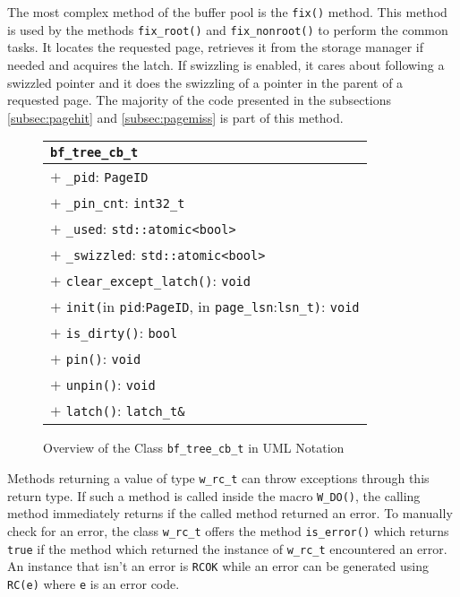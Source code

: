 	The most complex method of the buffer pool is the \lstinline{fix()} method. This method is used by the methods \lstinline{fix_root()} and \lstinline{fix_nonroot()} to perform the common tasks. It locates the requested page, retrieves it from the storage manager if needed and acquires the latch. If swizzling is enabled, it cares about following a swizzled pointer and it does the swizzling of a pointer in the parent of a requested page. The majority of the code presented in the subsections \ref{subsec:pagehit} and \ref{subsec:pagemiss} is part of this method.
		
\begin{@empty}
	\begin{figure}[ht!]
		\centering
		\scriptsize
		\setlength{\fboxsep}{0pt}
		\colorbox{listingsbackground}{\begin{tabularx}{\textwidth}{|X|}
			\hline
			\texttt{\textbf{bf\_tree\_cb\_t}}																																\\	\hline
			$+$ \texttt{\_pid}: \texttt{PageID}																															\\
			$+$ \texttt{\_pin\_cnt}: \texttt{int32\_t}																														\\
			$+$ \texttt{\_used}: \texttt{std::atomic<bool>}																													\\
			$+$ \texttt{\_swizzled}: \texttt{std::atomic<bool>}																												\\	\hline
			$+$ \texttt{clear\_except\_latch()}: \texttt{void}																													\\
			$+$ \texttt{init(}in \texttt{pid}:\texttt{PageID}, in \texttt{page\_lsn}:\texttt{lsn\_t)}: \texttt{void}																					\\
			$+$ \texttt{is\_dirty()}: \texttt{bool}																															\\
			$+$ \texttt{pin()}: \texttt{void}																																\\
			$+$ \texttt{unpin()}: \texttt{void}																																\\
			$+$ \texttt{latch()}: \texttt{latch\_t\&}																															\\	\hline
		\end{tabularx}}
		\caption{Overview of the Class \lstinline{bf_tree_cb_t} in UML Notation}
		\label{fig:cbdesign}
	\end{figure}
\end{@empty}

	Methods returning a value of type \lstinline{w_rc_t} can throw exceptions through this return type. If such a method is called inside the macro \lstinline{W_DO()}, the calling method immediately returns if the called method returned an error. To manually check for an error, the class \lstinline{w_rc_t} offers the method \lstinline{is_error()} which returns \lstinline{true} if the method which returned the instance of \lstinline{w_rc_t} encountered an error. An instance that isn't an error is \lstinline{RCOK} while an error can be generated using \lstinline{RC(e)} where \lstinline{e} is an error code. 

